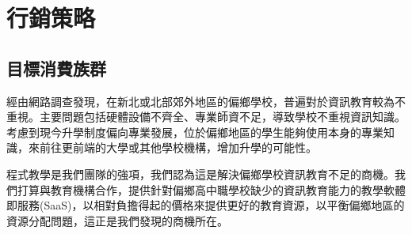 \section{行銷策略}

\subsection{目標消費族群}
\par 經由網路調查發現，在新北或北部郊外地區的偏鄉學校，普遍對於資訊教育較為不重視。主要問題包括硬體設備不齊全、專業師資不足，導致學校不重視資訊知識。考慮到現今升學制度偏向專業發展，位於偏鄉地區的學生能夠使用本身的專業知識，來前往更前端的大學或其他學校機構，增加升學的可能性。
\par 程式教學是我們團隊的強項，我們認為這是解決偏鄉學校資訊教育不足的商機。我們打算與教育機構合作，提供針對偏鄉高中職學校缺少的資訊教育能力的教學軟體即服務(SaaS)，以相對負擔得起的價格來提供更好的教育資源，以平衡偏鄉地區的資源分配問題，這正是我們發現的商機所在。

